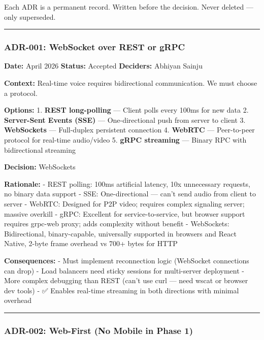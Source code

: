 \documentclass[
  11pt,
]{article}
\begin{document}
Each ADR is a permanent record. Written before the decision. Never
deleted --- only superseded.

\begin{center}\rule{0.5\linewidth}{0.5pt}\end{center}

\hypertarget{adr-001-websocket-over-rest-or-grpc}{%
\subsubsection{ADR-001: WebSocket over REST or
gRPC}\label{adr-001-websocket-over-rest-or-grpc}}

\textbf{Date:} April 2026 \textbar{} \textbf{Status:} Accepted
\textbar{} \textbf{Deciders:} Abhiyan Sainju

\textbf{Context:} Real-time voice requires bidirectional communication.
We must choose a protocol.

\textbf{Options:} 1. \textbf{REST long-polling} --- Client polls every
100ms for new data 2. \textbf{Server-Sent Events (SSE)} ---
One-directional push from server to client 3. \textbf{WebSockets} ---
Full-duplex persistent connection 4. \textbf{WebRTC} --- Peer-to-peer
protocol for real-time audio/video 5. \textbf{gRPC streaming} --- Binary
RPC with bidirectional streaming

\textbf{Decision:} WebSockets

\textbf{Rationale:} - REST polling: 100ms artificial latency, 10x
unnecessary requests, no binary data support - SSE: One-directional ---
can't send audio from client to server - WebRTC: Designed for P2P video;
requires complex signaling server; massive overkill - gRPC: Excellent
for service-to-service, but browser support requires grpc-web proxy;
adds complexity without benefit - WebSockets: Bidirectional,
binary-capable, universally supported in browsers and React Native,
2-byte frame overhead vs 700+ bytes for HTTP

\textbf{Consequences:} - Must implement reconnection logic (WebSocket
connections can drop) - Load balancers need sticky sessions for
multi-server deployment - More complex debugging than REST (can't use
curl --- need wscat or browser dev tools) - ✅ Enables real-time
streaming in both directions with minimal overhead

\begin{center}\rule{0.5\linewidth}{0.5pt}\end{center}

\hypertarget{adr-002-web-first-no-mobile-in-phase-1}{%
\subsubsection{ADR-002: Web-First (No Mobile in Phase
1)}\label{adr-002-web-first-no-mobile-in-phase-1}}
\end{document}
